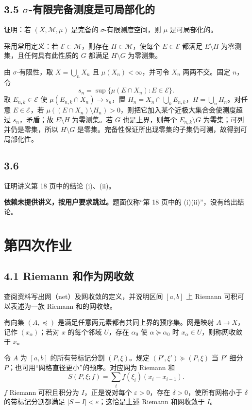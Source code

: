 \subsection*{3.5 $\sigma$-有限完备测度是可局部化的}
\begin{problem}
证明：若 $(X,\mathcal M,\mu)$ 是完备的 $\sigma$-有限测度空间，则 $\mu$ 是可局部化的。
\end{problem}
采用常用定义：若 $\mathcal E\subset\mathcal M$，则存在 $H\in\mathcal M$，使每个 $E\in\mathcal E$ 都满足 $E\setminus H$ 为零测集，且任何具有此性质的 $G$ 都满足 $H\setminus G$ 为零测集。

由 $\sigma$-有限性，取 $X=\bigcup_nX_n$ 且 $\mu(X_n)<\infty$，并可令 $X_n$ 两两不交。固定 $n$，令
\[
s_n=\sup\{\mu(E\cap X_n):E\in\mathcal E\}.
\]
取 $E_{n,k}\in\mathcal E$ 使 $\mu(E_{n,k}\cap X_n)\to s_n$，置
$H_n=X_n\cap\bigcup_kE_{n,k}$，$H=\bigcup_nH_n$。对任意 $E\in\mathcal E$，若
$\mu((E\cap X_n)\setminus H_n)>0$，则把它加入某个近极大集合会使测度超过 $s_n$，矛盾；故 $E\setminus H$ 为零测集。若 $G$ 也是上界，则每个 $E_{n,k}\setminus G$ 为零集；可列并仍是零集，所以 $H\setminus G$ 是零集。完备性保证所出现零集的子集仍可测，故得到可局部化性。

\subsection*{3.6}
\begin{problem}
证明讲义第 18 页中的结论 (i)、(ii)。
\end{problem}
\textbf{依赖未提供讲义，按用户要求跳过。}题面仅称“第 18 页中的 (i)(ii)”，没有给出结论。

\section{第四次作业}

\subsection*{4.1 Riemann 和作为网收敛}
\begin{problem}
查阅资料写出网（net）及网收敛的定义，并说明区间 $[a,b]$ 上 Riemann 可积可以表述为一族 Riemann 和的网收敛。
\end{problem}
有向集 $(A,\preceq)$ 是满足任意两元素都有共同上界的预序集。网是映射 $A\to X$，记作 $(x_\alpha)$；若对 $x$ 的每个邻域 $U$，存在 $\alpha_0$ 使 $\alpha\succeq\alpha_0$ 时 $x_\alpha\in U$，则称网收敛于 $x$。

令 $A$ 为 $[a,b]$ 的所有带标记分割 $(P,\xi)$。规定 $(P',\xi')\succeq(P,\xi)$ 当 $P'$ 细分 $P$；也可用“网格直径更小”的预序。对应网为 Riemann 和
\[
S(P,\xi;f)=\sum_i f(\xi_i)(x_i-x_{i-1}).
\]
$f$ Riemann 可积且积分为 $I$，正是说对每个 $\varepsilon>0$，存在 $\delta>0$，使所有网格小于 $\delta$ 的带标记分割都满足 $|S-I|<\varepsilon$；这恰是上述 Riemann 和网收敛于 $I$。

